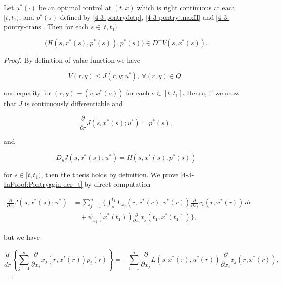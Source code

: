 \begin{theorem}
    Let $u^{\ast}(\cdot)$ be an optimal control at $(t,x)$ which is right continuous at each $[t,t_1)$, and $p^{\ast}(s)$ defined by \ref{4-3-pontrydotp}, \ref{4-3-pontry-maxH} and \ref{4-3-pontry-trans}. 
    Then for each $s\in[t,t_1)$ 
    
    \begin{equation}
        \bigg(H(s,x^{\ast}(s),p^{\ast}(s)),p^{\ast}(s)\bigg) \in D^+V(s,x^{\ast}(s)).
    \end{equation}

    \begin{proof}
        By definition of value function we have

        \[V(r,y) \leq J(r,y;u^{\ast}),\,\forall (r,y)\in Q,\]

        and equality for $(r,y)=(s,x^{\ast}(s))$ for each $s\in[t,t_1]$. Hence, if we show that $J$ is continuously differentiable and

        \begin{equation}\label{4-3-InProof:Pontryagin-der_t}
            \frac{\partial}{\partial r}J(s,x^{\ast}(s);u^{\ast}) = p^{\ast}(s),
        \end{equation}

        and 

        \begin{equation}\label{4-3-InProof:Pontryagin-der_x}
            D_yJ(s,x^{\ast}(s);u^{\ast}) = H(s,x^{\ast}(s),p^{\ast}(s))
        \end{equation}

        for $s\in[t,t_1)$, then the thesis holds by definition. We prove \ref{4-3-InProof:Pontryagin-der_t} by direct computation 

        \begin{align*}
            \frac{\partial}{\partial x_i}J(s,x^{\ast}(s);u^{\ast}) & = \sum_{j=1}^n\Bigg\{\int_s^{t_1} L_{x_j}(r,x^{\ast}(r),u^{\ast}(r))\frac{\partial}{\partial x_j}x_i(r,x^{\ast}(r))\,dr \\
            & \quad + \psi_{x_j}(x^{\ast}(t_1))\frac{\partial}{\partial x_i}x_j(t_1,x^{\ast}(t_1))\Bigg\},
        \end{align*}

        but we have
        
        \begin{equation}
            \frac{d}{dr}\left\{\sum_{j=1}^n \frac{\partial}{\partial x_i}x_j(r,x^{\ast}(r))p_i(r) \right\} = - \sum_{i=1}^n \frac{\partial}{\partial x_{j}}L(s,x^{\ast}(r),u^{\ast}(r))\frac{\partial}{\partial x_i}x_j(r,x^{\ast}(r)),
        \end{equation}


\end{proof}
\end{theorem}
